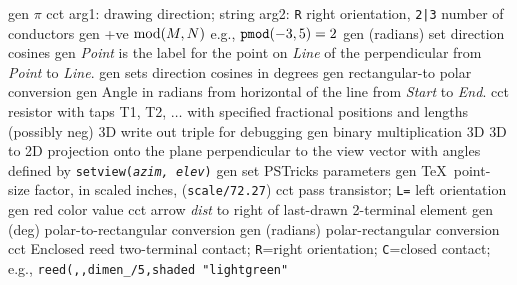   {gen}
  {$\pi$}
  {cct}
  {arg1: drawing direction; string arg2: {\tt R} right orientation,
   {\tt 2|3} number of conductors
   }
  {gen}
  {+ve $\hbox{mod}(M,N)$ e.g., $\hbox{\tt pmod}(-3,5)=2$}
  {gen}
  {(radians) set direction cosines}
  {gen}
  {{\sl Point} is the label for the point on {\sl Line} of the perpendicular
   from {\sl Point} to {\sl Line}.}
  {gen}
  {sets direction cosines in degrees }
  {gen}
  {rectangular-to polar conversion}
  {gen}
  {Angle in radians from horizontal of the line from {\sl Start} to {\sl End}.}
  {cct}
  {resistor with taps T1, T2, $\ldots$
    with specified fractional positions and lengths (possibly neg) 
   }
  {3D}
  {write out triple for debugging}
  {gen}
  {binary multiplication}
  {3D}
  {3D to 2D projection onto the plane perpendicular to the view vector with
   angles defined by {\tt setview({\sl azim, elev})}}
  {gen}
  {set PSTricks parameters}
  {gen}
  {\TeX\ point-size factor, in scaled inches, ({\tt *scale/72.27})}
  {cct}
  {pass transistor; {\tt L=} left orientation
    }
%
  {gen}
  {red color value}
  {cct}
  {arrow {\sl dist} to right of last-drawn 2-terminal element
   }
  {gen}
  {(deg) polar-to-rectangular conversion}
  {gen}
  {(radians) polar-rectangular conversion}
  {cct}
  {Enclosed reed two-terminal contact;
   {\tt R}=right orientation; {\tt C}=closed contact;
   e.g., {\tt reed(,,dimen\_/5,shaded "lightgreen"}
   }
